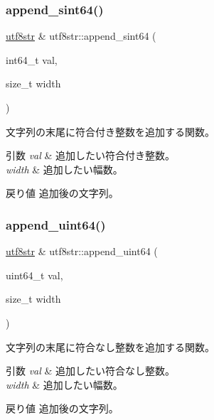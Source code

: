 \subsubsection{\texorpdfstring{append\+\_\+sint64()}{append\_sint64()}}
{\footnotesize\ttfamily \hyperlink{classutf8str}{utf8str} \& utf8str\+::append\+\_\+sint64 (\begin{DoxyParamCaption}\item[{int64\+\_\+t}]{val,  }\item[{size\+\_\+t}]{width }\end{DoxyParamCaption})}

文字列の末尾に符合付き整数を追加する関数。 
\begin{DoxyParams}{引数}
{\em val} & 追加したい符合付き整数。 \\
\hline
{\em width} & 追加したい幅数。 \\
\hline
\end{DoxyParams}
\begin{DoxyReturn}{戻り値}
追加後の文字列。 
\end{DoxyReturn}
\hypertarget{classutf8str_a50b19cd178e6ed1826eeb178b70f6ad0}{}\label{classutf8str_a50b19cd178e6ed1826eeb178b70f6ad0} 
\subsubsection{\texorpdfstring{append\+\_\+uint64()}{append\_uint64()}}
{\footnotesize\ttfamily \hyperlink{classutf8str}{utf8str} \& utf8str\+::append\+\_\+uint64 (\begin{DoxyParamCaption}\item[{uint64\+\_\+t}]{val,  }\item[{size\+\_\+t}]{width }\end{DoxyParamCaption})}

文字列の末尾に符合なし整数を追加する関数。 
\begin{DoxyParams}{引数}
{\em val} & 追加したい符合なし整数。 \\
\hline
{\em width} & 追加したい幅数。 \\
\hline
\end{DoxyParams}
\begin{DoxyReturn}{戻り値}
追加後の文字列。 
\end{DoxyReturn}
\hypertarget{classutf8str_a45bfe024b4a081b4b78588c250bf412b}{}\label{classutf8str_a45bfe024b4a081b4b78588c250bf412b} 
